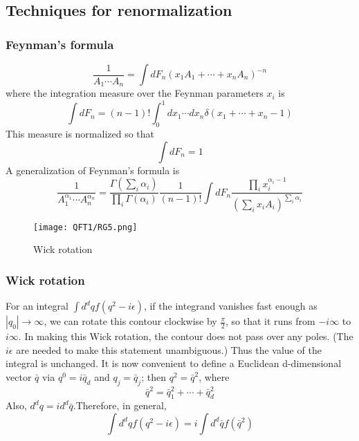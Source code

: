 \documentclass[cyan]{elegantnote}
\begin{document}
\subsection{Techniques for renormalization}
\subsubsection{Feynman's formula}
\begin{newthem}
\[ \frac{1}{A_1 \cdots A_n} = \int dF_n (x_1A_1+ \cdots +x_nA_n)^{-n}\]
where the integration measure over the Feynman parameters $x_i$ is
\[\int dF_n = (n-1)! \int_0^1 dx_1 \cdots dx_n \delta(x_1+\cdots+x_n-1)\]
This measure is normalized so that
\[\int dF_n = 1\]
A generalization of Feynman's formula is
\[ \frac{1}{A_1^{\alpha_1} \cdots A_n^{\alpha_n}} = \frac{\Gamma(\sum_i \alpha_i)}{\prod_i \Gamma(\alpha_i)} \frac{1}{(n-1)!}\int dF_n \frac{\prod_i x_i^{\alpha_i-1}}{(\sum_i x_i A_i)^{\sum_i \alpha_i}}\]
\end{newthem}
\begin{figure}[!h]
\centering
\texttt{[image: QFT1/RG5.png]}
\caption{Wick rotation}
\end{figure}

\subsubsection{Wick rotation}
For an integral $\int d^d q f(q^2-i\epsilon)$, if the integrand vanishes fast enough as $|q_0| \to \infty$, we can rotate this contour clockwise by $\frac{\pi}{2}$, so that it runs from $-i\infty$ to $i\infty$. In making this Wick rotation, the contour does not pass over any poles. (The $i\epsilon$ are needed to make this statement unambiguous.) Thus the value of the integral is unchanged. It is now convenient to define a Euclidean d-dimensional vector $\bar{q}$ via $q^0 = i \bar{q}_d$ and $q_j = \bar{q}_j$; then $q^2 = \bar{q}^2$, where
\[\bar{q}^2 = \bar{q}_1^2 + \cdots + \bar{q}_d^2\]
Also, $d^dq = id^d \bar{q}$.Therefore, in general,
\[\int d^d q f(q^2-i\epsilon) = i \int d^d\bar{q} f(\bar{q}^2)\]
\end{document}
